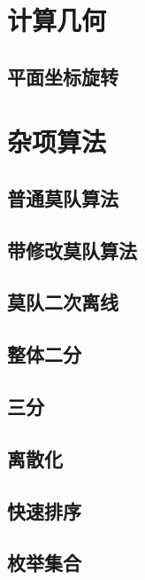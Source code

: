 \documentclass[twocolumn,a4]{article}  %
\begin{document}
	\section{计算几何}
		\subsection{平面坐标旋转}
	 	 	
	
	\section{杂项算法}
		\subsection{普通莫队算法}
	 	 	
	 	 	
	 	\subsection{带修改莫队算法}
	 	 	
	 	 	
	 	\subsection{莫队二次离线}
	 	 	
	 	 	
	 	\subsection{整体二分}
	 	 	
	 	 	
	 	\subsection{三分}
	 	 	
	 	 	
	 	\subsection{离散化}
	 	 	
	 	 	
	 	\subsection{快速排序}
	 	 	
	 	 	
 	 	\subsection{枚举集合}
	 	 	
	 	 	
\end{document}
